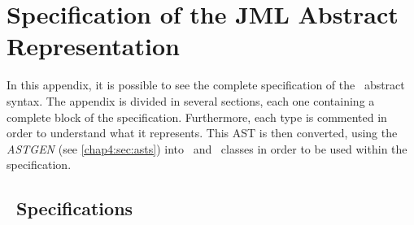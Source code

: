 \chapter{Specification of the JML Abstract Representation}
\label{appendix:jmlast}

In this appendix, it is possible to see the complete specification of the \jml\ abstract syntax. The appendix is divided in several sections, each one containing a complete block of the specification. Furthermore, each type is commented in order to understand what it represents. This AST is then converted, using the \textit{ASTGEN} (see \ref{chap4:sec:asts}) into \java\ and \vpp\ classes in order to be used within the specification. 

\section{\jml\ Specifications}

